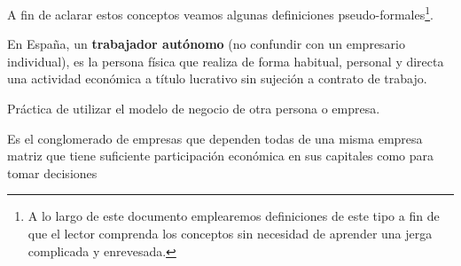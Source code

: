 \documentclass[nochap,palatino,shortheader]{apuntes}
\begin{document}
A fin de aclarar estos conceptos veamos algunas definiciones pseudo-formales\footnote{A lo largo de este documento emplearemos definiciones de este tipo a fin de que el lector comprenda los conceptos sin necesidad de aprender una jerga complicada y enrevesada.}.

\begin{defn}[Autónomo]
En España, un \textbf{trabajador autónomo} (no confundir con un empresario individual), es la persona física que realiza de forma habitual, personal y directa una actividad económica a título lucrativo sin sujeción a contrato de trabajo.
\end{defn}

\begin{defn}[Franquicia]
Práctica de utilizar el modelo de negocio de otra persona o empresa.
\end{defn}

\begin{defn}
Es el conglomerado de empresas que dependen todas de una misma empresa matriz que tiene suficiente participación económica en sus capitales como para tomar decisiones
\end{defn}
\end{document}

